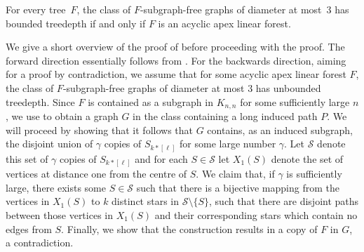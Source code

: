 \documentclass[runningheads,envcountsame]{llncs}
\newcommand{\forbiddenGraph}{F}
\begin{document}
\begin{theorem}
  \label{thm:diam3aalf}
  For every tree~$\forbiddenGraph$, the class of
  $\forbiddenGraph$-subgraph-free graphs of diameter at most~$3$
  has bounded treedepth if and only if $\forbiddenGraph$ is an
  acyclic apex linear forest.
\end{theorem} 
  We give a short overview of the proof of  before proceeding with the proof.
  The forward direction essentially follows from . For the backwards direction,
  aiming for a proof by contradiction, we assume that for some acyclic apex linear forest $\forbiddenGraph$, the class of $\forbiddenGraph$-subgraph-free graphs of diameter at most $3$ has unbounded treedepth. Since $\forbiddenGraph$ is contained as a subgraph in $K_{n,n}$ for some sufficiently large $n$, we use  to obtain a graph $G$ in the class containing a long induced path $P$.
  We will proceed by showing that 
  it follows that $G$ contains, as an induced subgraph, the disjoint union of $\gamma$ copies of
  $S_{k*[\ell]}$ for some large number $\gamma$. Let $\mathcal{S}$ denote this set of $\gamma$ copies of $S_{k*[\ell]}$ and for each $S \in \mathcal{S}$ let $X_1(S)$ denote the set of vertices at distance one from the centre of $S$. We claim that, if $\gamma$ is sufficiently large, there exists some $S \in \mathcal{S}$ such that there is a bijective mapping from the vertices in $X_1(S)$ to $k$ distinct stars in $\mathcal{S} \setminus \{S\}$, such that there are disjoint paths between those vertices in $X_1(S)$ and their corresponding stars which contain no edges from $S$. 
  Finally, we show that the construction results in a copy of $\forbiddenGraph$ in $G$, a contradiction.
\end{document}
